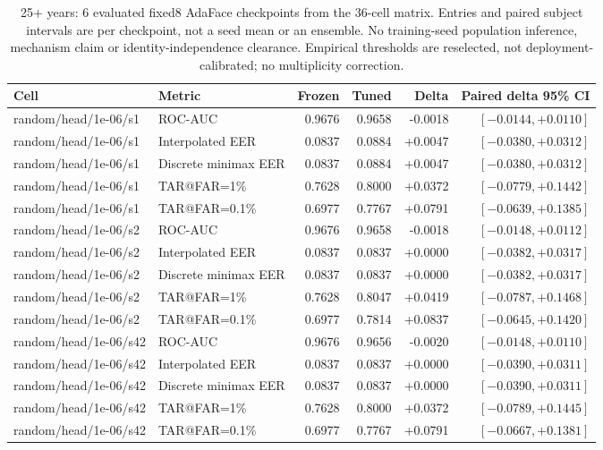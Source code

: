 \begin{table}[!t]
\caption{25+ years: 6 evaluated fixed8 AdaFace checkpoints from the 36-cell matrix. Entries and paired subject intervals are per checkpoint, not a seed mean or an ensemble. No training-seed population inference, mechanism claim or identity-independence clearance. Empirical thresholds are reselected, not deployment-calibrated; no multiplicity correction.}
\label{tab:strong-fixed8-large-gap-25plus}
\centering\scriptsize
\begin{tabular}{@{}llrrrr@{}}
\toprule
Cell & Metric & Frozen & Tuned & Delta & Paired delta 95\% CI \\
\midrule
random/head/1e-06/s1 & ROC-AUC & 0.9676 & 0.9658 & -0.0018 & $[-0.0144,+0.0110]$ \\
random/head/1e-06/s1 & Interpolated EER & 0.0837 & 0.0884 & +0.0047 & $[-0.0380,+0.0312]$ \\
random/head/1e-06/s1 & Discrete minimax EER & 0.0837 & 0.0884 & +0.0047 & $[-0.0380,+0.0312]$ \\
random/head/1e-06/s1 & TAR@FAR=1\% & 0.7628 & 0.8000 & +0.0372 & $[-0.0779,+0.1442]$ \\
random/head/1e-06/s1 & TAR@FAR=0.1\% & 0.6977 & 0.7767 & +0.0791 & $[-0.0639,+0.1385]$ \\
random/head/1e-06/s2 & ROC-AUC & 0.9676 & 0.9658 & -0.0018 & $[-0.0148,+0.0112]$ \\
random/head/1e-06/s2 & Interpolated EER & 0.0837 & 0.0837 & +0.0000 & $[-0.0382,+0.0317]$ \\
random/head/1e-06/s2 & Discrete minimax EER & 0.0837 & 0.0837 & +0.0000 & $[-0.0382,+0.0317]$ \\
random/head/1e-06/s2 & TAR@FAR=1\% & 0.7628 & 0.8047 & +0.0419 & $[-0.0787,+0.1468]$ \\
random/head/1e-06/s2 & TAR@FAR=0.1\% & 0.6977 & 0.7814 & +0.0837 & $[-0.0645,+0.1420]$ \\
random/head/1e-06/s42 & ROC-AUC & 0.9676 & 0.9656 & -0.0020 & $[-0.0148,+0.0110]$ \\
random/head/1e-06/s42 & Interpolated EER & 0.0837 & 0.0837 & +0.0000 & $[-0.0390,+0.0311]$ \\
random/head/1e-06/s42 & Discrete minimax EER & 0.0837 & 0.0837 & +0.0000 & $[-0.0390,+0.0311]$ \\
random/head/1e-06/s42 & TAR@FAR=1\% & 0.7628 & 0.8000 & +0.0372 & $[-0.0789,+0.1445]$ \\
random/head/1e-06/s42 & TAR@FAR=0.1\% & 0.6977 & 0.7767 & +0.0791 & $[-0.0667,+0.1381]$ \\

\end{tabular}
\end{table}
